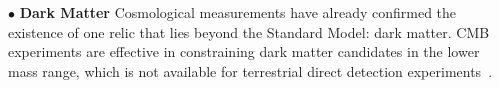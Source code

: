 \documentclass[PICOAPC.tex]{subfiles}
\begin{document}


\noindent$\bullet$ {\bf Dark Matter} \hspace{0.1in} Cosmological measurements have already confirmed the existence of one relic that lies beyond the Standard Model: dark matter. \ac{CMB} experiments are effective in constraining dark matter candidates in the lower mass range, which is not available for terrestrial direct detection experiments~\citep{Slatyer2009,Galli2009,Huetsi2009,Huetsi2011,Madhavacheril:2013cna,Green:2018pmd}. 

\end{document}
